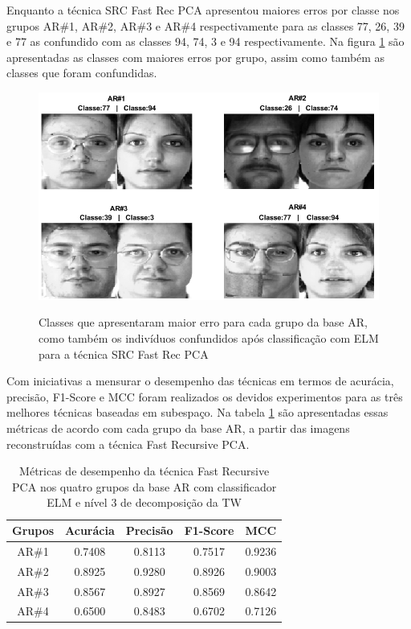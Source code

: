 Enquanto a técnica SRC Fast Rec PCA apresentou maiores erros por classe nos grupos AR\#1, AR\#2, AR\#3 e AR\#4 respectivamente para as classes 77, 26, 39 e 77 as confundido com as classes 94, 74, 3 e 94 respectivamente. Na figura \ref{fig:classes_erradas_src_fast_rec_pca} são apresentadas as classes com maiores erros por grupo, assim como também as classes que foram confundidas.

\begin{figure}[H]
\centering
\caption{Classes que apresentaram maior erro para cada grupo da base AR, como também os indivíduos confundidos após classificação com ELM para a técnica SRC Fast Rec PCA}
\includegraphics[scale=0.55]{imgs4/classes_confudidas_src_recPca}
\label{fig:classes_erradas_src_fast_rec_pca}
\end{figure}



Com iniciativas a mensurar o desempenho das técnicas em termos de acurácia, precisão, F1-Score e MCC foram realizados os devidos experimentos para as três melhores técnicas baseadas em subespaço. Na tabela \ref{tab:teste_estatistico_fast_rec_pca} são apresentadas essas métricas de acordo com cada grupo da base AR, a partir das imagens reconstruídas com a técnica Fast Recursive PCA.



\begin{table}[htpb]
    \centering
	\caption{Métricas de desempenho da técnica Fast Recursive PCA nos quatro grupos da base AR com classificador ELM e nível 3 de decomposição da TW}
\begin{tabular}{|c|c|c|c|c|}
\hline
\textbf{Grupos} & \textbf{Acurácia}  & \textbf{Precisão} & \textbf{F1-Score} & \textbf{MCC} \\\hline

AR\#1 &	0.7408	& 0.8113	& 0.7517	& 0.9236 \\\hline
AR\#2 &	0.8925	& 0.9280	& 0.8926	& 0.9003\\\hline
AR\#3 &	0.8567	&0.8927		& 0.8569	& 0.8642\\\hline
AR\#4 &	0.6500	&0.8483		& 0.6702	& 0.7126 \\\hline

\end{tabular}
\label{tab:teste_estatistico_fast_rec_pca}
\end{table}

